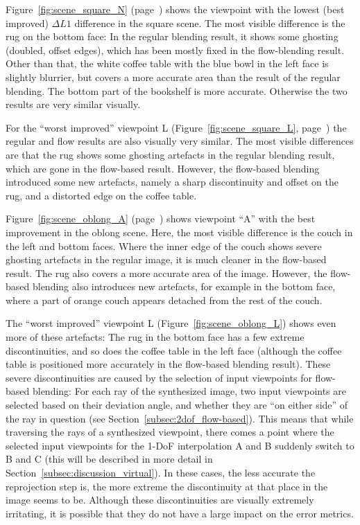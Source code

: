 Figure~\ref{fig:scene_square_N} (page~\pageref{fig:scene_square_N}) shows the viewpoint with the lowest (best improved) $\Delta L1$ difference in the square scene. The most visible difference is the rug on the bottom face: In the regular blending result, it shows some ghosting (doubled, offset edges), which has been mostly fixed in the flow-blending result. Other than that, the white coffee table with the blue bowl in the left face is slightly blurrier, but covers a more accurate area than the result of the regular blending. The bottom part of the bookshelf is more accurate. Otherwise the two results are very similar visually.

For the ``worst improved'' viewpoint L (Figure~\ref{fig:scene_square_L}, page~\pageref{fig:scene_square_L}) the regular and flow results are also visually very similar. The most visible differences are that the rug shows some ghosting artefacts in the regular blending result, which are gone in the flow-based result. However, the flow-based blending introduced some new artefacts, namely a sharp discontinuity and offset on the rug, and a distorted edge on the coffee table.

Figure~\ref{fig:scene_oblong_A} (page~\pageref{fig:scene_oblong_A}) shows viewpoint ``A'' with the best improvement in the oblong scene. Here, the most visible difference is the couch in the left and bottom faces. Where the inner edge of the couch shows severe ghosting artefacts in the regular image, it is much cleaner in the flow-based result. The rug also covers a more accurate area of the image. However, the flow-based blending also introduces new artefacts, for example in the bottom face, where a part of orange couch appears detached from the rest of the couch.

The ``worst improved'' viewpoint L (Figure~\ref{fig:scene_oblong_L}) shows even more of these artefacts: The rug in the bottom face has a few extreme discontinuities, and so does the coffee table in the left face (although the coffee table is positioned more accurately in the flow-based blending result).
These severe discontinuities are caused by the selection of input viewpoints for flow-based blending: For each ray of the synthesized image, two input viewpoints are selected based on their deviation angle, and whether they are ``on either side'' of the ray in question (see Section~\ref{subsec:2dof_flow-based}).
This means that while traversing the rays of a synthesized viewpoint, there comes a point where the selected input viewpoints for the 1-DoF interpolation A and B suddenly switch to B and C (this will be described in more detail in Section~\ref{subsec:discussion_virtual}). In these cases, the less accurate the reprojection step is, the more extreme the discontinuity at that place in the image seems to be. Although these discontinuities are visually extremely irritating, it is possible that they do not have a large impact on the error metrics.

